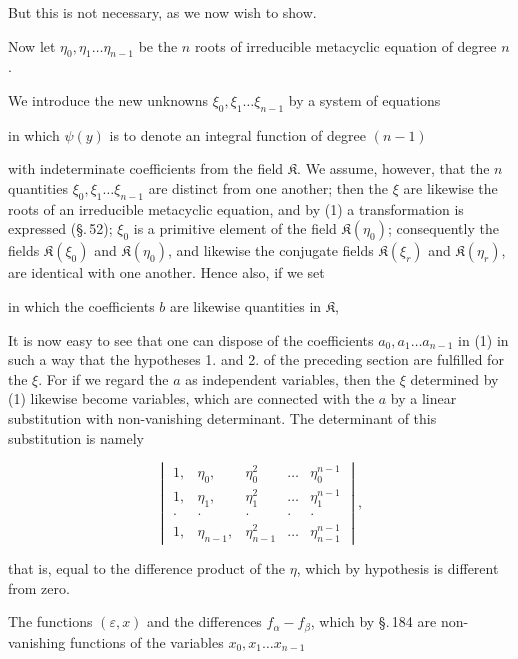 
But this is not necessary, as we now wish to show.

Now let $\eta_0, \eta_1 \ldots \eta_{n-1}$ be the $n$ roots of  irreducible metacyclic equation of degree $n$.

We introduce the new unknowns $\xi_0, \xi_1 \ldots \xi_{n-1}$ by a system of equations


in which $\psi(y)$ is to denote an integral function of degree $(n-1)$


with indeterminate coefficients from the field $\mathfrak{K}$. We assume, however, that the $n$ quantities $\xi_0, \xi_1 \ldots \xi_{n-1}$ are distinct from one another; then the $\xi$ are likewise the roots of an irreducible metacyclic equation, and by (1) a  transformation is expressed (\S.\,52); $\xi_0$ is a primitive element of the field $\mathfrak{K}(\eta_0)$; consequently the fields $\mathfrak{K}(\xi_0)$ and $\mathfrak{K}(\eta_0)$, and likewise the conjugate fields $\mathfrak{K}(\xi_r)$ and $\mathfrak{K}(\eta_r)$, are identical with one another. Hence also, if we set


in which the coefficients $b$ are likewise quantities in $\mathfrak{K}$,


It is now easy to see that one can dispose of the coefficients $a_0, a_1 \ldots a_{n-1}$ in (1) in such a way that the hypotheses 1. and 2. of the preceding section are fulfilled for the $\xi$. For if we regard the $a$ as independent variables, then the $\xi$ determined by (1) likewise become variables, which are connected with the $a$ by a linear substitution with non-vanishing determinant. The determinant of this substitution is namely

\[
\begin{vmatrix}
1, & \eta_0, & \eta_0^2 & \ldots & \eta_0^{n-1} \\
1, & \eta_1, & \eta_1^2 & \ldots & \eta_1^{n-1} \\
\cdot & \cdot & \cdot & \cdot & \cdot \\
1, & \eta_{n-1}, & \eta_{n-1}^2 & \ldots & \eta_{n-1}^{n-1}
\end{vmatrix},
\]

that is, equal to the difference product of the $\eta$, which by hypothesis is different from zero.

The functions $(\varepsilon, x)$ and the differences $f_\alpha - f_\beta$, which by \S.\,184 are non-vanishing functions of the variables $x_0, x_1 \ldots x_{n-1}$
